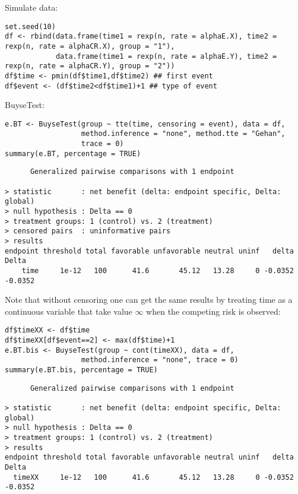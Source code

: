 \documentclass[12pt]{article}
\begin{document}
Simulate data:
\lstset{language=r,label= ,caption= ,captionpos=b,numbers=none}
\begin{lstlisting}
set.seed(10)
df <- rbind(data.frame(time1 = rexp(n, rate = alphaE.X), time2 = rexp(n, rate = alphaCR.X), group = "1"),
			data.frame(time1 = rexp(n, rate = alphaE.Y), time2 = rexp(n, rate = alphaCR.Y), group = "2"))
df$time <- pmin(df$time1,df$time2) ## first event
df$event <- (df$time2<df$time1)+1 ## type of event
\end{lstlisting}

BuyseTest:
\lstset{language=r,label= ,caption= ,captionpos=b,numbers=none}
\begin{lstlisting}
e.BT <- BuyseTest(group ~ tte(time, censoring = event), data = df,
				  method.inference = "none", method.tte = "Gehan",
				  trace = 0)
summary(e.BT, percentage = TRUE)
\end{lstlisting}

\begin{verbatim}
      Generalized pairwise comparisons with 1 endpoint

> statistic       : net benefit (delta: endpoint specific, Delta: global) 
> null hypothesis : Delta == 0 
> treatment groups: 1 (control) vs. 2 (treatment) 
> censored pairs  : uninformative pairs
> results
endpoint threshold total favorable unfavorable neutral uninf   delta   Delta
    time     1e-12   100      41.6       45.12   13.28     0 -0.0352 -0.0352
\end{verbatim}

Note that without censoring one can get the same results by treating
time as a continuous variable that take value \(\infty\) when the
competing risk is observed:
\lstset{language=r,label= ,caption= ,captionpos=b,numbers=none}
\begin{lstlisting}
df$timeXX <- df$time
df$timeXX[df$event==2] <- max(df$time)+1
e.BT.bis <- BuyseTest(group ~ cont(timeXX), data = df,
				  method.inference = "none", trace = 0)
summary(e.BT.bis, percentage = TRUE)
\end{lstlisting}

\begin{verbatim}
      Generalized pairwise comparisons with 1 endpoint

> statistic       : net benefit (delta: endpoint specific, Delta: global) 
> null hypothesis : Delta == 0 
> treatment groups: 1 (control) vs. 2 (treatment) 
> results
endpoint threshold total favorable unfavorable neutral uninf   delta   Delta
  timeXX     1e-12   100      41.6       45.12   13.28     0 -0.0352 -0.0352
\end{verbatim}
\end{document}
